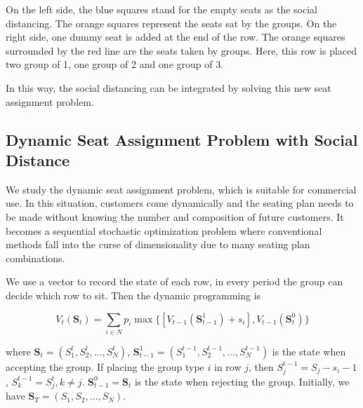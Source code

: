 On the left side, the blue squares stand for the empty seats as the social distancing. The orange squares represent the seats sat by the groups. 
On the right side, one dummy seat is added at the end of the row. The orange squares surrounded by the red line are the seats taken by groups. Here, this row is placed two group of 1, one group of 2 and one group of 3.

In this way, the social distancing can be integrated by solving this new seat assignment problem.








\subsection{Dynamic Seat Assignment Problem with Social Distance}\label{dynamic_demand}

We study the dynamic seat assignment problem, which is suitable for commercial use. In this situation, customers come dynamically and the seating plan needs to be made without knowing the number and composition of future customers. It becomes a sequential stochastic optimization problem where conventional methods fall into the curse of dimensionality due to many seating plan combinations. 

We use a vector to record the state of each row, in every period the group can decide which row to sit. Then the dynamic programming is

$$V_{t}(\mathbf{S}_{t}) = \sum_{i \in N} p_i \max\{ {[V_{t-1}(\mathbf{S}_{t-1}^{1})+ s_i]}, {V_{t-1}(\mathbf{S}_{t}^{0})}\}$$

where $\mathbf{S}_{t} = (S_1^{t}, S_2^{t}, \ldots, S_{N}^{t})$, $\mathbf{S}_{t-1}^{1} = (S_1^{t-1}, S_2^{t-1}, \ldots, S_{N}^{t-1})$ is the state when accepting the group. If placing the group type $i$ in row $j$, then $S_{j}^{t-1} = S_{j}-s_{i}-1$, $S_{k}^{t-1} = S_{j}^{t}, k \neq j$. $\mathbf{S}_{t-1}^{0} = \mathbf{S}_{t}$ is the state when rejecting the group. Initially, we have $\mathbf{S}_{T} = (S_1, S_2, \ldots, S_{N})$.

